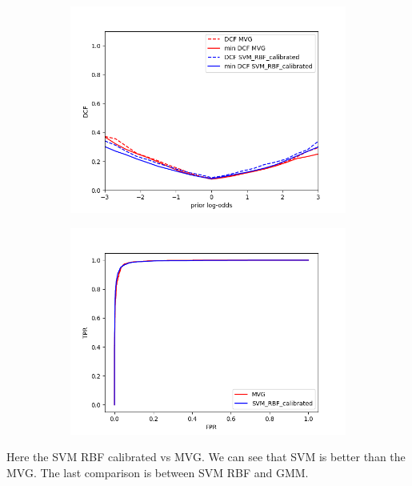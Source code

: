 \documentclass[english]{report}
\begin{document}
\begin{figure}[H]
    \begin{subfigure}{0.5\textwidth}
        \includegraphics[scale=0.5]{../../images/comparison/evaluation/DCF_MVG&SVM_RBF_calibrated}
    \end{subfigure}
    \begin{subfigure}{0.5\textwidth}
        \includegraphics[scale=0.5]{../../images/comparison/evaluation/ROC_MVG&SVM_RBF_calibrated}
    \end{subfigure}
    \label{fig:eval_MVGvsSVMcalib}
\end{figure}
Here the SVM RBF calibrated vs MVG. We can see that SVM is better than the MVG. The last comparison
is between SVM RBF and GMM.
\end{document}
